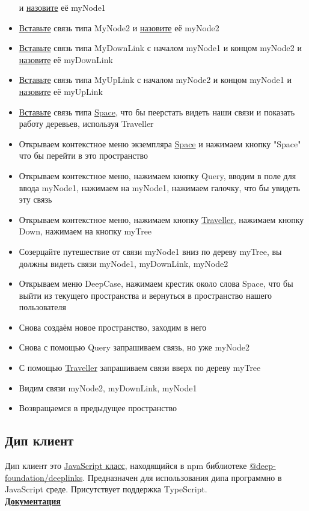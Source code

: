 \documentclass{article}
\begin{document}
\begin{itemize}
        и \hyperlink{FAQ.HowToSetName}{назовите} её myNode1
  \item \hyperlink{DeepCase.InsertLink.Description}{Вставьте} связь типа MyNode2
        и \hyperlink{FAQ.HowToSetName}{назовите} её myNode2
  \item \hyperlink{DeepCase.InsertLink.Description}{Вставьте} связь типа
        MyDownLink с началом myNode1 и концом myNode2 и \hyperlink{FAQ.HowToSetName}{назовите} её myDownLink
  \item \hyperlink{DeepCase.InsertLink.Description}{Вставьте} связь типа MyUpLink с началом myNode2 и концом myNode1 и
        \hyperlink{FAQ.HowToSetName}{назовите} её myUpLink
  \item \hyperlink{DeepCase.InsertLink.Description}{Вставьте} связь типа
        \hyperlink{Core.Space.Description}{Space}, что бы пеерстать видеть наши связи и показать
        работу деревьев, используя Traveller
  \item Открываем контекстное меню экземпляра \hyperlink{Core.Space.Description}{Space} и
        нажимаем кнопку "Space" что бы перейти в это пространство
  \item Открываем контекстное меню, нажимаем кнопку Query, вводим в поле для
        ввода myNode1, нажимаем на myNode1, нажимаем галочку, что бы увидеть
        эту связь
  \item Открываем контекстное меню, нажимаем кнопку
        \hyperlink{Traveller.Description}{Traveller}, нажимаем кнопку Down, нажимаем на
        кнопку
        myTree
  \item Созерцайте путешествие от связи myNode1 вниз по дереву myTree, вы
        должны видеть связи myNode1, myDownLink, myNode2
  \item Открываем меню DeepCase, нажимаем крестик около слова Space, что бы
        выйти из текущего пространства и вернуться в пространство нашего
        пользователя
  \item Снова создаём новое пространство, заходим в него
  \item Снова с помощью Query запрашиваем связь, но уже myNode2
  \item С помощью \hyperlink{Traveller.Description}{Traveller} запрашиваем связи вверх
        по дереву myTree
  \item Видим связи myNode2, myDownLink, myNode1
  \item Возвращаемся в предыдущее пространство
\end{itemize}

\subsection{Дип клиент}
Дип клиент это \href{https://github.com/deep-foundation/deeplinks/blob/main/imports/client.tsx}{JavaScript класс}, находящийся в npm библиотеке
\href{https://www.npmjs.com/package/@deep-foundation/deeplinks}{@deep-foundation/deeplinks}. Предназначен для использования дипа
программно в JavaScript среде. Присутствует поддержка TypeScript. \\
\href{https://deep-foundation.github.io/deeplinks/classes/client.DeepClient.html}{\textbf{Документация}}
\end{document}
